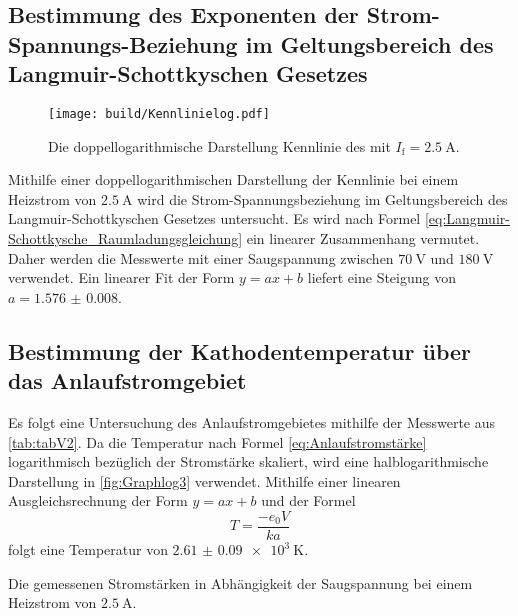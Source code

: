 \subsection{Bestimmung des Exponenten der Strom-Spannungs-Beziehung im Geltungsbereich des Langmuir-Schottkyschen Gesetzes}
\begin{figure}
 \centering
 \caption{Die doppellogarithmische Darstellung Kennlinie des mit $I_\text{f} = \SI{2.5}{\ampere}$.}
 \texttt{[image: build/Kennlinielog.pdf]}
 \label{fig:Graphlog2}
\end{figure}
Mithilfe einer doppellogarithmischen Darstellung der Kennlinie bei einem Heizstrom von $\SI{2.5}{\ampere}$
 wird die Strom-Spannungsbeziehung im Geltungsbereich des Langmuir-Schottkyschen Gesetzes untersucht.
 Es wird nach Formel \ref{eq:Langmuir-Schottkysche_Raumladungsgleichung} ein linearer Zusammenhang vermutet.
Daher werden die Messwerte mit einer Saugspannung zwischen $\SI{70}{\volt}$
und $\SI{180}{\volt}$ verwendet. Ein linearer Fit der Form $y = a x+b$ liefert
eine Steigung von $a = \num{1.576(8)}$.























\subsection{Bestimmung der Kathodentemperatur über das Anlaufstromgebiet}
Es folgt eine Untersuchung des Anlaufstromgebietes mithilfe der Messwerte aus \ref{tab:tabV2}.
Da die Temperatur nach Formel \ref{eq:Anlaufstromstärke} logarithmisch bezüglich
der Stromstärke skaliert, wird eine halblogarithmische Darstellung in
\ref{fig:Graphlog3} verwendet. Mithilfe einer linearen Ausgleichsrechnung der Form
$y = a x+b$ und der Formel
\begin{equation}
  T = \frac{-e_0 V}{k a}
  \end{equation}
  folgt eine Temperatur von $\SI{2.61(9)e3}{\kelvin}$.

 \begin{table}
  \centering
  \caption{Die gemessenen Stromstärken in Abhängigkeit der Saugspannung bei einem Heizstrom von $\SI{2,5}{\ampere}$.}
  
  \label{tab:tabV2}
 \end{table}

